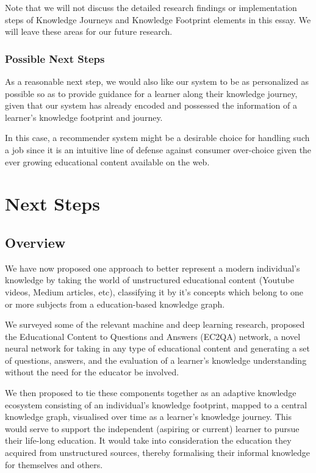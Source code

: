 \documentclass[]{book}
\theoremstyle{definition}
\theoremstyle{definition}
\theoremstyle{definition}
\theoremstyle{remark}
\begin{document}
Note that we will not discuss the detailed research findings or
implementation steps of Knowledge Journeys and Knowledge Footprint
elements in this essay. We will leave these areas for our future
research.

\subsection{Possible Next Steps}\label{possible-next-steps}

As a reasonable next step, we would also like our system to be as
personalized as possible so as to provide guidance for a learner along
their knowledge journey, given that our system has already encoded and
possessed the information of a learner's knowledge footprint and
journey.

In this case, a recommender system might be a desirable choice for
handling such a job since it is an intuitive line of defense against
consumer over-choice given the ever growing educational content
available on the web.

\chapter{Next Steps}\label{next-steps}

\section{Overview}\label{overview}

We have now proposed one approach to better represent a modern
individual's knowledge by taking the world of unstructured educational
content (Youtube videos, Medium articles, etc), classifying it by it's
concepts which belong to one or more subjects from a education-based
knowledge graph.

We surveyed some of the relevant machine and deep learning research,
proposed the Educational Content to Questions and Answers (EC2QA)
network, a novel neural network for taking in any type of educational
content and generating a set of questions, answers, and the evaluation
of a learner's knowledge understanding without the need for the educator
be involved.

We then proposed to tie these components together as an adaptive
knowledge ecosystem consisting of an individual's knowledge footprint,
mapped to a central knowledge graph, visualised over time as a learner's
knowledge journey. This would serve to support the independent (aspiring
or current) learner to pursue their life-long education. It would take
into consideration the education they acquired from unstructured
sources, thereby formalising their informal knowledge for themselves and
others.
\end{document}
